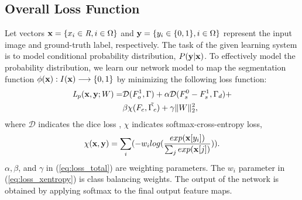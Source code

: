 \documentclass[journal]{IEEEtran}
\begin{document}
\subsection{Overall Loss Function}
Let vectors \(\bold{x}=\{x_i\in\textit{R}, i\in\Omega\}\) and \(\bold{y}=\{y_i\in\{0,1\}, i\in\Omega\}\) represent the input image and ground-truth label, respectively. The task of the given learning system is to model conditional probability distribution, \(P(\bold{y}|\bold{x})\). To effectively model the probability distribution, we learn our network model to map the segmentation function \(\phi(\bold{x}):I(\bold{x})\longrightarrow\{0,1\}\) by minimizing the following loss function:
\newline
\begin{equation}
\begin{split}
    \textit{L}_p(\bold{x}, \bold{y};W)=&\mathcal{D}(F^1_o, \Gamma)+\alpha\mathcal{D}(F^0_s-F^1_s, \Gamma_d)+\\
    &\beta\chi(F_c, \Tilde{\Gamma_c})+\gamma\|W\|_2^2,
\label{eq:loss_total}
\end{split}
\end{equation}
\newline
where \(\mathcal{D}\) indicates the dice loss \cite{milletari2016v}, \(\chi\) indicates softmax-cross-entropy loss,
\newline
\begin{equation}
    \chi(\bold{x}, \bold{y})=\sum_i(-w_i log(\frac{exp(\bold{x}[y_i])}{\sum_j{exp(\bold{x}[j])}})).
\label{eq:loss_xentropy}
\end{equation}
\newline
\(\alpha, \beta\), and \(\gamma\) in (\ref{eq:loss_total}) are weighting parameters. The \(w_i\) parameter in (\ref{eq:loss_xentropy}) is class balancing weights. The output of the network is obtained by applying softmax to the final output feature maps.\par
\end{document}
